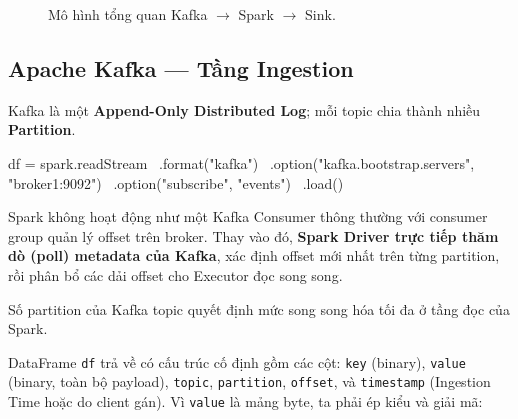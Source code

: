 \documentclass[12pt]{article}
\begin{document}
\begin{figure}[H]
\centering
{}
\caption{Mô hình tổng quan Kafka $\rightarrow$ Spark $\rightarrow$ Sink.}
\label{fig:overview}
\end{figure}

\subsection{Apache Kafka --- Tầng Ingestion}

Kafka là một \textbf{Append-Only Distributed Log}; mỗi topic chia thành nhiều \textbf{Partition}.

\begin{aivnpybox}
df = spark.readStream \
    .format("kafka") \
    .option("kafka.bootstrap.servers", "broker1:9092") \
    .option("subscribe", "events") \
    .load()
\end{aivnpybox}

Spark không hoạt động như một Kafka Consumer thông thường với consumer group quản lý offset trên broker. Thay vào đó, \textbf{Spark Driver trực tiếp thăm dò (poll) metadata của Kafka}, xác định offset mới nhất trên từng partition, rồi phân bổ các dải offset cho Executor đọc song song.

\begin{notebox}
Số partition của Kafka topic quyết định mức song song hóa tối đa ở tầng đọc của Spark.
\end{notebox}

\medskip
DataFrame \texttt{df} trả về có cấu trúc cố định gồm các cột: \texttt{key} (binary), \texttt{value} (binary, toàn bộ payload), \texttt{topic}, \texttt{partition}, \texttt{offset}, và \texttt{timestamp} (Ingestion Time hoặc do client gán). Vì \texttt{value} là mảng byte, ta phải ép kiểu và giải mã:
\end{document}
